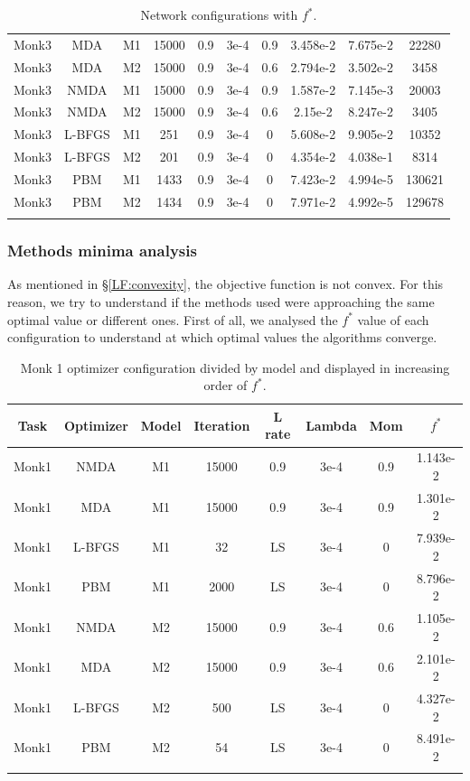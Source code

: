 \begin{center}
\begin{longtable}{|c|c|c|c|c|c|c|c|c|c|}
			Monk3 & MDA & M1 & 15000 & 0.9 & 3e-4  & 0.9 & 3.458e-2 & 7.675e-2 & 22280 \\
			Monk3 & MDA & M2 & 15000 & 0.9 & 3e-4  & 0.6 & 2.794e-2 & 3.502e-2 & 3458 \\
			Monk3 & NMDA & M1 & 15000 & 0.9 & 3e-4  & 0.9 & 1.587e-2 & 7.145e-3 & 20003 \\
			Monk3 & NMDA & M2 & 15000 & 0.9 & 3e-4  & 0.6 & 2.15e-2 & 8.247e-2 & 3405 \\
			Monk3 & L-BFGS & M1 & 251 & 0.9 & 3e-4  & 0 & 5.608e-2 & 9.905e-2 & 10352 \\
			Monk3 & L-BFGS & M2 & 201 & 0.9 & 3e-4  & 0 & 4.354e-2 & 4.038e-1 & 8314 \\
			Monk3 & PBM & M1 & 1433 & 0.9 & 3e-4  & 0 & 7.423e-2 & 4.994e-5 & 130621 \\
			Monk3 & PBM & M2 & 1434 & 0.9 & 3e-4  & 0 & 7.971e-2 & 4.992e-5 & 129678  \\
			\hline
			\caption{Network configurations with $f^*$.}
			\label{tab:nets_res}
		\end{longtable}

\end{center}

\subsubsection{Methods minima analysis} 

As mentioned in \S\ref{LF:convexity}, the objective function is not convex. For this reason, we try to understand if the methods used were approaching the same optimal value or different ones.
First of all, we analysed the $f^{*}$ value of each configuration to understand at which optimal values the algorithms converge. 

\begin{longtable}{|c|c|c|c|c|c|c|c|}
	\hline
	\centering
	\textbf{Task}&\textbf{Optimizer}&\textbf{Model} &\textbf{Iteration} & \textbf{L rate} & \multicolumn{1}{l|}{\textbf{Lambda}} & \textbf{Mom} & \textbf{$f^{*}$} \\ \hline 
	Monk1 & NMDA & M1 & 15000 & 0.9 & 3e-4  & 0.9 & 1.143e-2 	\\
	Monk1 & MDA & M1 & 15000 & 0.9 & 3e-4  & 0.9 & 1.301e-2  		\\
	Monk1 & L-BFGS & M1 & 32 & LS & 3e-4  & 0 &  7.939e-2 			\\
	Monk1 & PBM & M1 & 2000 & LS & 3e-4  & 0 & 8.796e-2  			\\
	Monk1 & NMDA & M2 & 15000 & 0.9 & 3e-4  & 0.6 & 1.105e-2 	\\
	Monk1 & MDA & M2 & 15000 & 0.9 & 3e-4  & 0.6 & 2.101e-2 		\\
	Monk1 & L-BFGS & M2 & 500 & LS & 3e-4  & 0 &   4.327e-2 		\\
	Monk1 & PBM & M2 & 54 & LS & 3e-4  & 0 & 8.491e-2 				\\
	\hline
	\caption{Monk 1 optimizer configuration divided by model and displayed in increasing order of $f^*$.}
	\label{tab:nets_res_plots_Monk1}
\end{longtable}

